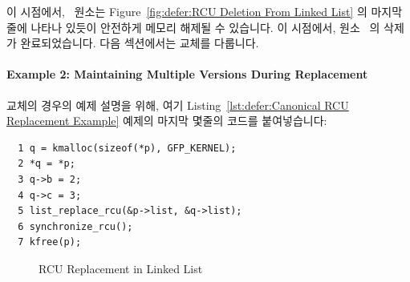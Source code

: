 이 시점에서, ~원소는
Figure~\ref{fig:defer:RCU Deletion From Linked List} 의 마지막 줄에 나타나
있듯이 안전하게 메모리 해제될 수 있습니다.
이 시점에서, 원소~ 의 삭제가 완료되었습니다.
다음 섹션에서는 교체를 다룹니다.

\paragraph{Example 2: Maintaining Multiple Versions During Replacement}
\label{sec:defer:Example 2: Maintaining Multiple Versions During Replacement}

교체의 경우의 예제 설명을 위해, 여기
Listing~\ref{lst:defer:Canonical RCU Replacement Example} 예제의
마지막 몇줄의 코드를 붙여넣습니다:

\vspace{5pt}
\begin{minipage}[t]{\columnwidth}
\scriptsize
\begin{verbatim}
  1 q = kmalloc(sizeof(*p), GFP_KERNEL);
  2 *q = *p;
  3 q->b = 2;
  4 q->c = 3;
  5 list_replace_rcu(&p->list, &q->list);
  6 synchronize_rcu();
  7 kfree(p);
\end{verbatim}
\end{minipage}
\vspace{5pt}

\begin{figure}[tbp]
\begin{center}
\end{center}
\caption{RCU Replacement in Linked List}
\label{fig:defer:RCU Replacement in Linked List}
\end{figure}

